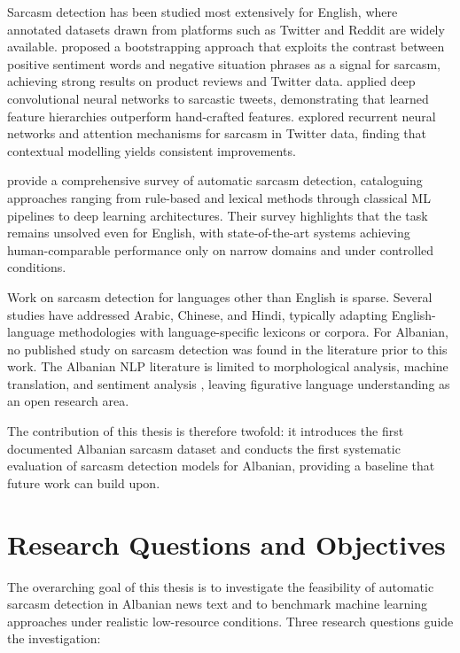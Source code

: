 \documentclass[12pt,a4paper]{article}
\begin{document}
Sarcasm detection has been studied most extensively for English, where annotated datasets drawn from platforms such as Twitter and Reddit are widely available. \citet{riloff2013sarcasm} proposed a bootstrapping approach that exploits the contrast between positive sentiment words and negative situation phrases as a signal for sarcasm, achieving strong results on product reviews and Twitter data. \citet{poria2016deeper} applied deep convolutional neural networks to sarcastic tweets, demonstrating that learned feature hierarchies outperform hand-crafted features. \citet{ghosh2016fracking} explored recurrent neural networks and attention mechanisms for sarcasm in Twitter data, finding that contextual modelling yields consistent improvements.

\citet{joshi2017automatic} provide a comprehensive survey of automatic sarcasm detection, cataloguing approaches ranging from rule-based and lexical methods through classical ML pipelines to deep learning architectures. Their survey highlights that the task remains unsolved even for English, with state-of-the-art systems achieving human-comparable performance only on narrow domains and under controlled conditions.

Work on sarcasm detection for languages other than English is sparse. Several studies have addressed Arabic, Chinese, and Hindi, typically adapting English-language methodologies with language-specific lexicons or corpora. For Albanian, no published study on sarcasm detection was found in the literature prior to this work. The Albanian NLP literature is limited to morphological analysis, machine translation, and sentiment analysis \citep{hedderich2021survey}, leaving figurative language understanding as an open research area.

The contribution of this thesis is therefore twofold: it introduces the first documented Albanian sarcasm dataset and conducts the first systematic evaluation of sarcasm detection models for Albanian, providing a baseline that future work can build upon.

\newpage
\section{Research Questions and Objectives}
\label{sec:rq}

The overarching goal of this thesis is to investigate the feasibility of automatic sarcasm detection in Albanian news text and to benchmark machine learning approaches under realistic low-resource conditions. Three research questions guide the investigation:
\end{document}
